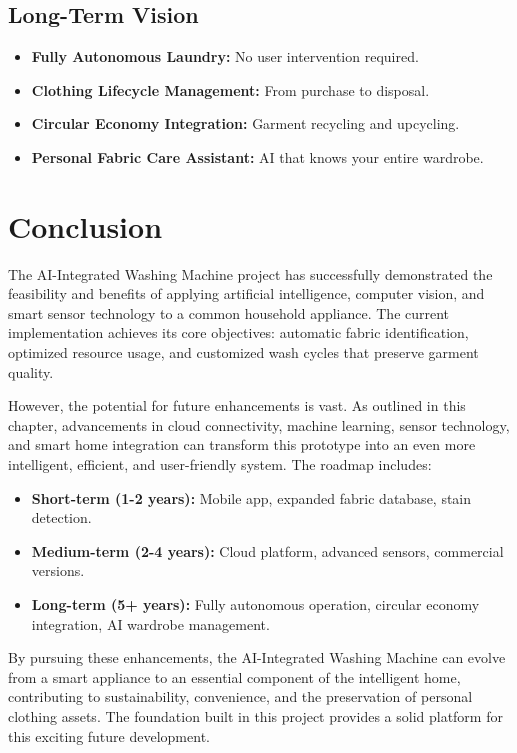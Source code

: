 \subsection{Long-Term Vision}
\begin{itemize}
    \item \textbf{Fully Autonomous Laundry:} No user intervention required.
    \item \textbf{Clothing Lifecycle Management:} From purchase to disposal.
    \item \textbf{Circular Economy Integration:} Garment recycling and upcycling.
    \item \textbf{Personal Fabric Care Assistant:} AI that knows your entire wardrobe.
\end{itemize}

\section{Conclusion}

The AI-Integrated Washing Machine project has successfully demonstrated the feasibility and benefits of applying artificial intelligence, computer vision, and smart sensor technology to a common household appliance. The current implementation achieves its core objectives: automatic fabric identification, optimized resource usage, and customized wash cycles that preserve garment quality.

However, the potential for future enhancements is vast. As outlined in this chapter, advancements in cloud connectivity, machine learning, sensor technology, and smart home integration can transform this prototype into an even more intelligent, efficient, and user-friendly system. The roadmap includes:

\begin{itemize}
    \item \textbf{Short-term (1-2 years):} Mobile app, expanded fabric database, stain detection.
    \item \textbf{Medium-term (2-4 years):} Cloud platform, advanced sensors, commercial versions.
    \item \textbf{Long-term (5+ years):} Fully autonomous operation, circular economy integration, AI wardrobe management.
\end{itemize}

By pursuing these enhancements, the AI-Integrated Washing Machine can evolve from a smart appliance to an essential component of the intelligent home, contributing to sustainability, convenience, and the preservation of personal clothing assets. The foundation built in this project provides a solid platform for this exciting future development.
